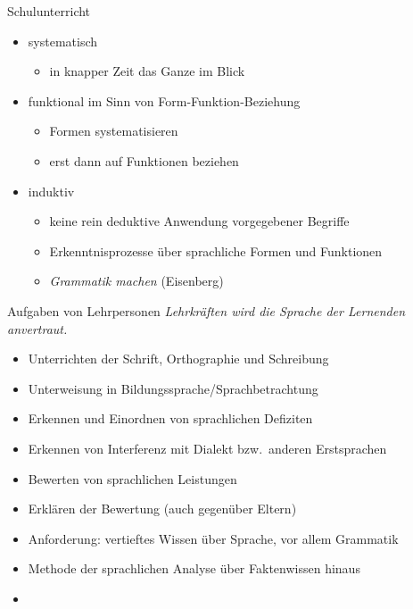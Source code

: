 \begin{frame}
  {Schulunterricht}
  \onslide<+->
  \begin{itemize}[<+->]
    \item \alert{systematisch}
      \begin{itemize}
        \item in knapper Zeit das Ganze im Blick
      \end{itemize}
      \Zeile
    \item funktional im Sinn von \alert{Form-Funktion-Beziehung}
      \begin{itemize}
        \item Formen systematisieren
        \item erst dann auf Funktionen beziehen
      \end{itemize}
      \Zeile
    \item \alert{induktiv}
      \begin{itemize}
        \item keine rein deduktive Anwendung vorgegebener Begriffe
        \item Erkenntnisprozesse über sprachliche Formen und Funktionen
        \item \alert{\textit{Grammatik machen}} (Eisenberg)
      \end{itemize}
  \end{itemize}
\end{frame}

\begin{frame}
  {Aufgaben von Lehrpersonen}
  \onslide<+->
  \onslide<+->
  \alert{\textit{Lehrkräften wird die Sprache der Lernenden anvertraut.}} \\
  \Zeile
  \begin{itemize}[<+->]
    \item Unterrichten der Schrift, Orthographie und Schreibung
    \item Unterweisung in Bildungssprache\slash Sprachbetrachtung
    \item Erkennen und \alert{Einordnen} von \alert{sprachlichen Defiziten}
    \item Erkennen von \alert{Interferenz mit Dialekt bzw.\ anderen Erstsprachen}
    \item \alert{Bewerten} von sprachlichen Leistungen
    \item \alert{Erklären} der Bewertung (auch gegenüber Eltern)
      \Zeile
    \item[\ding{222}] Anforderung: vertieftes Wissen über Sprache, vor allem Grammatik
    \item[\ding{222}] Methode der sprachlichen Analyse über Faktenwissen hinaus
    \item[\ding{222}] 
  \end{itemize}
\end{frame}


